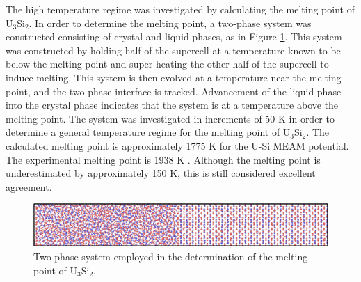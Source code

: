 \documentclass[review]{elsarticle}
\begin{document}
\FloatBarrier

The high temperature regime was investigated by calculating the melting point of U$_{3}$Si$_{2}$.  In order to determine the melting point, a two-phase system was constructed consisting of crystal and liquid phases, as in Figure \ref{fig:twophase}.  This system was constructed by holding half of the supercell at a temperature known to be below the melting point and super-heating the other half of the supercell to induce melting.  This system is then evolved at a temperature near the melting point, and the two-phase interface is tracked.  Advancement of the liquid phase into the crystal phase indicates that the system is at a temperature above the melting point.  The system was investigated in increments of 50 K in order to determine a general temperature regime for the melting point of U$_{3}$Si$_{2}$.  The calculated melting point is approximately 1775 K for the U-Si MEAM potential.  The experimental melting point is 1938 K \cite{berche2009}.  Although the melting point is underestimated by approximately 150 K, this is still considered excellent agreement.  

\begin{figure}[hbt]
	\centering
	\includegraphics[width=\textwidth]{two_phase2.png}
    \caption{Two-phase system employed in the determination of the melting point of U$_{3}$Si$_{2}$.}\label{fig:twophase}
\end{figure}

\FloatBarrier
\end{document}
